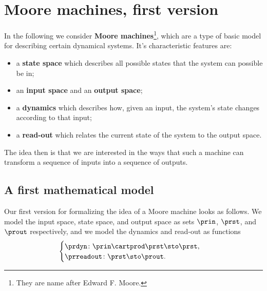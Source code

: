 
\section{Moore machines, first version}
\label{sec:moore-machines}



In the following we consider \textbf{Moore machines}\footnote{They are name after Edward F. Moore.}, which are a type of basic model for describing certain dynamical systems. It's characteristic features are: 
\begin{itemize}
\item a \textbf{state space} which describes all possible states that the system can possible be in;
\item an \textbf{input space} and an \textbf{output space};
\item a \textbf{dynamics} which describes how, given an input, the system's state changes according to that input;
\item a \textbf{read-out} which relates the current state of the system to the output space.
\end{itemize}
 The idea then is that we are interested in the ways that such a machine can transform a sequence of inputs into a sequence of outputs. 
 
 \subsection{A first mathematical model}
 
Our first version for formalizing the idea of a Moore machine looks as follows. We model the input space, state space, and output space as sets  $\prin$, $\prst$, and $\prout$ respectively, and we model the dynamics and read-out as functions
\begin{equation}
    \label{eq:moore-1}
    \begin{cases}
        \prdyn \colon \prin \cartprod \prst \sto \prst, \\
        \prreadout \colon \prst \sto \prout.
    \end{cases}
\end{equation}



